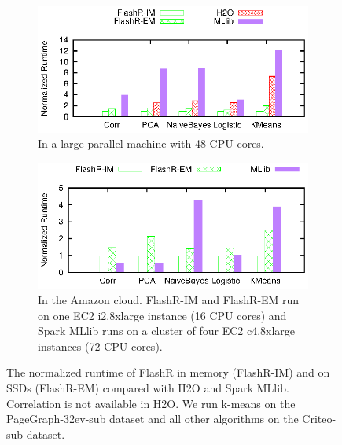 \begin{figure}
  \vspace{-5pt}
	\centering
	\footnotesize
	\begin{subfigure}{.5\textwidth}
		\includegraphics{FlashMatrix_figs/FlashR-vs-dist.eps}
		\caption{In a large parallel machine with 48 CPU cores.}
		\label{perf:para}
	\end{subfigure}

	\vspace{3pt}
	\begin{subfigure}{.5\textwidth}
		\includegraphics{FlashMatrix_figs/FlashR-vs-dist-EC2.eps}
		\caption{In the Amazon cloud. FlashR-IM and FlashR-EM run on one
			EC2 i2.8xlarge instance (16 CPU cores) and Spark MLlib runs
		on a cluster of four EC2 c4.8xlarge instances (72 CPU cores).}
		\label{perf:cloud}
	\end{subfigure}
	\vspace{-8pt}
	\caption{The normalized runtime of FlashR in memory (FlashR-IM) and
	on SSDs (FlashR-EM) compared with H2O and Spark MLlib. Correlation is not
	available in H2O. We run k-means on the PageGraph-32ev-sub dataset and
	all other algorithms on the Criteo-sub dataset.}
	\label{perf:rt}
  \vspace{-10pt}
\end{figure}


